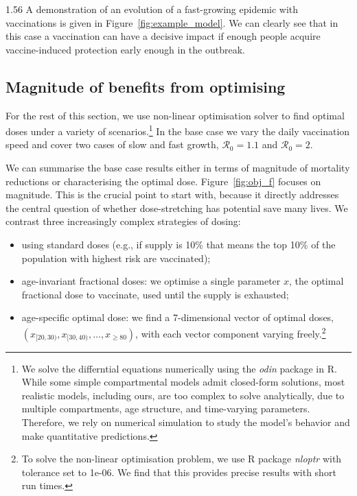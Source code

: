 \documentclass[12pt]{article}
\begin{document}
\begin{spacing}{1.56}
A demonstration of an evolution of a fast-growing epidemic with vaccinations is given in Figure~\ref{fig:example_model}. We can clearly see that in this case a vaccination can have a decisive impact if enough people acquire vaccine-induced protection early enough in the outbreak.


\subsection{Magnitude of benefits from optimising}

For the rest of this section, we use non-linear optimisation solver to find optimal doses under a variety of scenarios.\footnote{We solve the differntial equations numerically using the \textit{odin} package in R. While some simple compartmental models admit closed-form solutions, most realistic models, including ours, are too complex to solve analytically, due to multiple compartments, age structure, and time-varying parameters. Therefore, we rely on numerical simulation to study the model's behavior and make quantitative predictions.} In the base case we vary the daily vaccination speed and cover two cases of slow and fast growth, $\mathcal{R}_0 = 1.1$ and $\mathcal{R}_0 = 2$.

We can summarise the base case results either in terms of magnitude of mortality reductions or characterising the optimal dose. Figure~\ref{fig:obj_f} focuses on magnitude. This is the crucial point to start with, because it directly addresses the central question of whether dose-stretching has potential save many lives. We contrast three increasingly complex strategies of dosing:


\begin{itemize}

\item using standard doses (e.g., if supply is 10\% that means the top 10\% of the population with highest risk are vaccinated);
\item age-invariant fractional doses: we optimise a single parameter $x$, the optimal fractional dose to vaccinate, used until the supply is exhausted;
\item age-specific optimal dose: we find a 7-dimensional vector of optimal doses, $(x_{[20,30)}, \allowbreak x_{[30, 40)}, \ldots, x_{\geq 80})$, with each vector component varying freely.\footnote{To solve the non-linear optimisation problem, we use R package \textit{nloptr} with tolerance set to 1e-06. We find that this provides precise results with short run times.}


\end{itemize}
\end{spacing}
\end{document}

